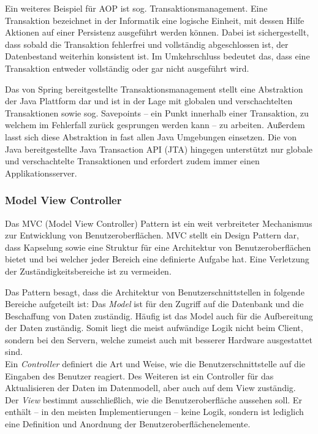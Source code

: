 				Ein weiteres Beispiel für \acs{AOP} ist sog. Transaktionsmanagement. Eine Transaktion bezeichnet in der Informatik eine logische Einheit, mit dessen Hilfe Aktionen auf einer Persistenz ausgeführt werden können. Dabei ist sichergestellt, dass sobald die Transaktion fehlerfrei und vollständig abgeschlossen ist, der Datenbestand weiterhin konsistent ist. Im Umkehrschluss bedeutet das, dass eine Transaktion entweder vollständig oder gar nicht ausgeführt wird. \cite{Ozsu.2011}
			
				Das von Spring bereitgestellte Transaktionsmanagement stellt eine Abstraktion der Java Plattform dar und ist in der Lage mit globalen und verschachtelten Transaktionen sowie sog. Savepoints -- ein Punkt innerhalb einer Transaktion, zu welchem im Fehlerfall zurück gesprungen werden kann -- zu arbeiten. Außerdem lasst sich diese Abstraktion in fast allen Java Umgebungen einsetzen. Die von Java bereitgestellte Java Transaction API (\acs{JTA}) hingegen unterstützt nur globale und verschachtelte Transaktionen und erfordert zudem immer einen Applikationsserver. 
			
			\subsubsection{Model View Controller} %
			
				Das \acs{MVC} (Model View Controller) Pattern ist ein weit verbreiteter Mechanismus zur Entwicklung von Benutzeroberflächen. \acs{MVC} stellt ein Design Pattern dar, dass Kapselung sowie eine Struktur für eine Architektur von Benutzeroberflächen bietet und bei welcher jeder Bereich eine definierte Aufgabe hat. Eine Verletzung der Zuständigkeitsbereiche ist zu vermeiden. \cite{Gamma.1995}
			
				Das Pattern besagt, dass die Architektur von Benutzerschnittstellen in folgende Bereiche aufgeteilt ist: Das \textit{Model} ist für den Zugriff auf die Datenbank und die Beschaffung von Daten zuständig. Häufig ist das Model auch für die Aufbereitung der Daten zuständig. Somit liegt die meist aufwändige Logik nicht beim Client, sondern bei den Servern, welche zumeist auch mit besserer Hardware ausgestattet sind. \\
				Ein \textit{Controller} definiert die Art und Weise, wie die Benutzerschnittstelle auf die Eingaben des Benutzer reagiert. Des Weiteren ist ein Controller für das Aktualisieren der Daten im Datenmodell, aber auch auf dem View zuständig. \\
				Der \textit{View} bestimmt ausschließlich, wie die Benutzeroberfläche aussehen soll. Er enthält -- in den meisten Implementierungen -- keine Logik, sondern ist lediglich eine Definition und Anordnung der Benutzeroberflächenelemente.
				
